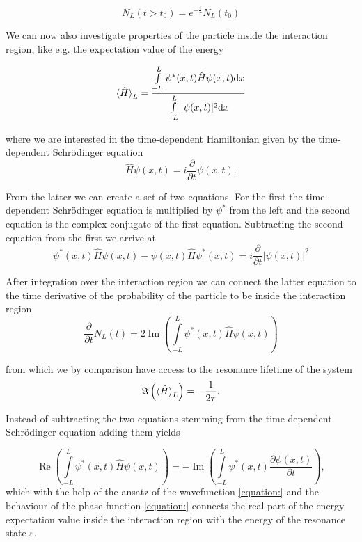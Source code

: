\begin{equation}
  N_L(t>t_0) = e^{-\frac t\tau} N_L(t_0)
\end{equation}

We can now also investigate properties of the particle inside the
interaction region, like e.g. the expectation value of the energy

\begin{equation}
  \braket{\hat{H}}_L = \frac{\int\limits_{-L}^L \psi^*(x,t) \hat{H} \psi(x,t) \mathrm dx}
                       {\int\limits_{-L}^L |\psi(x,t)|^2 \mathrm dx}
\end{equation}

where we are interested in the time-dependent Hamiltonian
given by the time-dependent Schrödinger equation
\begin{equation}
  \hat{H}\psi(x,t) = i \frac{\partial}{\partial t} \psi(x,t) .
\end{equation}

From the latter we can create a set of two equations. For the first
the time-dependent Schrödinger equation is multiplied by $\psi^*$ from the
left and the second equation is the complex conjugate of the first equation.
Subtracting the second equation from the first we arrive at
\begin{equation}
  \psi^*(x,t) \hat{H} \psi(x,t) - \psi(x,t) \hat{H} \psi^*(x,t) = 
      i \frac{\partial}{\partial t} |\psi(x,t)|^2
\end{equation}

After integration over the interaction region we can connect the latter equation
to the time derivative of the probability of the particle to be inside the
interaction region
\begin{equation}
  \frac{\partial}{\partial t} N_L(t) = 2 \operatorname{Im} \left(
       \int\limits_{-L}^L \psi^*(x,t) \hat{H} \psi(x,t) \right)
\end{equation}

from which we by comparison have access to the resonance lifetime of the system
\begin{equation}
  \Im \left( \braket{\hat{H}}_L \right) = -\frac{1}{2\tau}   .
\end{equation}

Instead of subtracting the two equations stemming from the time-dependent
Schrödinger equation adding them yields

\begin{equation}
  \operatorname{Re} \left( \int\limits_{-L}^L \psi^*(x,t) \hat{H} \psi(x,t) \right)
 = -\operatorname{Im} \left( \int\limits_{-L}^L \psi^*(x,t)
    \frac{\partial \psi(x,t)}{\partial t} \right)   ,
\end{equation}
which with the help of the ansatz of the wavefunction \ref{equation:}
and the behaviour of the phase function \ref{equation:}
connects the real part of the energy expectation value inside the interaction
region with the energy of the resonance state $\varepsilon$.


